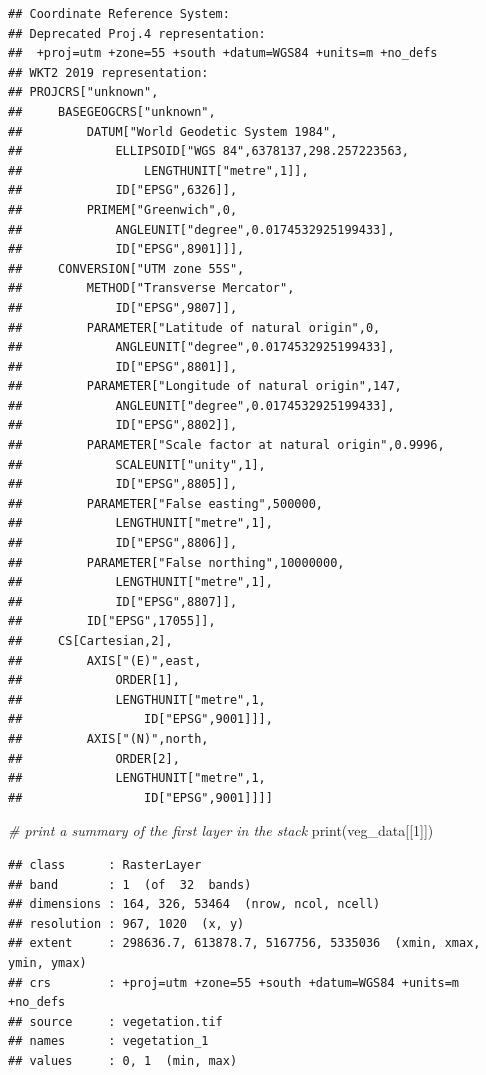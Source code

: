 \documentclass[
  12pt,
]{book}
\newenvironment{Shaded}{\begin{snugshade}}{\end{snugshade}}
\newcommand{\CommentTok}[1]{\textcolor[rgb]{0.56,0.35,0.01}{\textit{#1}}}
\newcommand{\DecValTok}[1]{\textcolor[rgb]{0.00,0.00,0.81}{#1}}
\newcommand{\FunctionTok}[1]{\textcolor[rgb]{0.00,0.00,0.00}{#1}}
\newcommand{\NormalTok}[1]{#1}
\begin{document}
\begin{verbatim}
## Coordinate Reference System:
## Deprecated Proj.4 representation:
##  +proj=utm +zone=55 +south +datum=WGS84 +units=m +no_defs 
## WKT2 2019 representation:
## PROJCRS["unknown",
##     BASEGEOGCRS["unknown",
##         DATUM["World Geodetic System 1984",
##             ELLIPSOID["WGS 84",6378137,298.257223563,
##                 LENGTHUNIT["metre",1]],
##             ID["EPSG",6326]],
##         PRIMEM["Greenwich",0,
##             ANGLEUNIT["degree",0.0174532925199433],
##             ID["EPSG",8901]]],
##     CONVERSION["UTM zone 55S",
##         METHOD["Transverse Mercator",
##             ID["EPSG",9807]],
##         PARAMETER["Latitude of natural origin",0,
##             ANGLEUNIT["degree",0.0174532925199433],
##             ID["EPSG",8801]],
##         PARAMETER["Longitude of natural origin",147,
##             ANGLEUNIT["degree",0.0174532925199433],
##             ID["EPSG",8802]],
##         PARAMETER["Scale factor at natural origin",0.9996,
##             SCALEUNIT["unity",1],
##             ID["EPSG",8805]],
##         PARAMETER["False easting",500000,
##             LENGTHUNIT["metre",1],
##             ID["EPSG",8806]],
##         PARAMETER["False northing",10000000,
##             LENGTHUNIT["metre",1],
##             ID["EPSG",8807]],
##         ID["EPSG",17055]],
##     CS[Cartesian,2],
##         AXIS["(E)",east,
##             ORDER[1],
##             LENGTHUNIT["metre",1,
##                 ID["EPSG",9001]]],
##         AXIS["(N)",north,
##             ORDER[2],
##             LENGTHUNIT["metre",1,
##                 ID["EPSG",9001]]]]
\end{verbatim}

\begin{Shaded}
\begin{Highlighting}[]
\CommentTok{\# print a summary of the first layer in the stack}
\FunctionTok{print}\NormalTok{(veg\_data[[}\DecValTok{1}\NormalTok{]])}
\end{Highlighting}
\end{Shaded}

\begin{verbatim}
## class      : RasterLayer 
## band       : 1  (of  32  bands)
## dimensions : 164, 326, 53464  (nrow, ncol, ncell)
## resolution : 967, 1020  (x, y)
## extent     : 298636.7, 613878.7, 5167756, 5335036  (xmin, xmax, ymin, ymax)
## crs        : +proj=utm +zone=55 +south +datum=WGS84 +units=m +no_defs 
## source     : vegetation.tif 
## names      : vegetation_1 
## values     : 0, 1  (min, max)
\end{verbatim}
\end{document}
